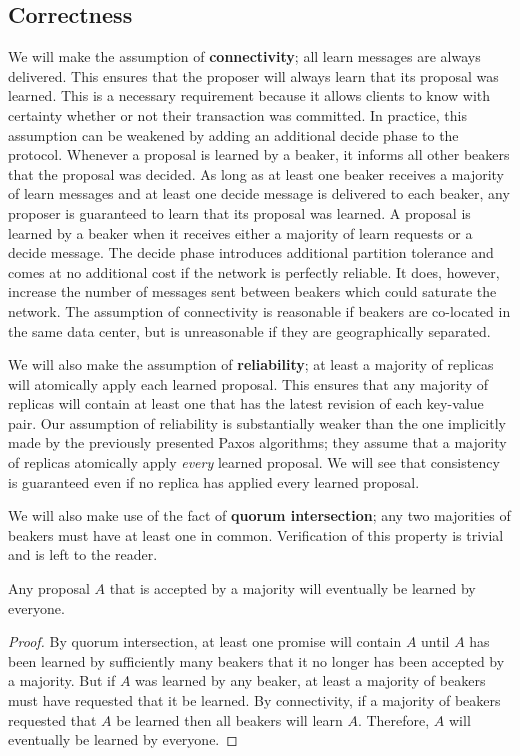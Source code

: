 \documentclass{article}
\begin{document}
    \subsection{Correctness}
    We will make the assumption of \textbf{connectivity}; all learn messages are always delivered.
    This ensures that the proposer will always learn that its proposal was learned. This is a
    necessary requirement because it allows clients to know with certainty whether or not their
    transaction was committed. In practice, this assumption can be weakened by adding an additional
    decide phase to the protocol. Whenever a proposal is learned by a beaker, it informs all other
    beakers that the proposal was decided. As long as at least one beaker receives a majority of
    learn messages and at least one decide message is delivered to each beaker, any proposer is
    guaranteed to learn that its proposal was learned. A proposal is learned by a beaker when it
    receives either a majority of learn requests or a decide message. The decide phase introduces
    additional partition tolerance and comes at no additional cost if the network is perfectly
    reliable. It does, however, increase the number of messages sent between beakers which could
    saturate the network. The assumption of connectivity is reasonable if beakers are co-located in
    the same data center, but is unreasonable if they are geographically separated.

    We will also make the assumption of \textbf{reliability}; at least a majority of replicas will
    atomically apply each learned proposal. This ensures that any majority of replicas will
    contain at least one that has the latest revision of each key-value pair. Our assumption of
    reliability is substantially weaker than the one implicitly made by the previously presented Paxos
    algorithms; they assume that a majority of replicas atomically apply \emph{every} learned
    proposal. We will see that consistency is guaranteed even if no replica has applied every learned
    proposal.

    We will also make use of the fact of \textbf{quorum intersection}; any two majorities of beakers
    must have at least one in common. Verification of this property is trivial and is left to the
    reader. \\

    \begin{theorem}[Liveness]
    Any proposal $A$ that is accepted by a majority will eventually be learned by everyone.
    \end{theorem}
    \begin{proof}
    By quorum intersection, at least one promise will contain $A$ until $A$ has been learned by
    sufficiently many beakers that it no longer has been accepted by a majority. But if $A$ was
    learned by any beaker, at least a majority of beakers must have requested that it be learned.
    By connectivity, if a majority of beakers requested that $A$ be learned then all beakers will
    learn $A$. Therefore, $A$ will eventually be learned by everyone.
    \end{proof}
\end{document}
